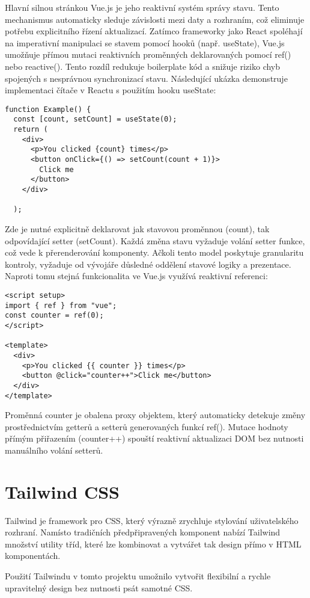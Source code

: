 Hlavní silnou stránkou Vue.js je jeho reaktivní systém správy stavu. Tento mechanismus automaticky sleduje závislosti mezi daty a rozhraním, což eliminuje potřebu explicitního řízení aktualizací\cite{vuejsVuejsDocs}.
Zatímco frameworky jako React spoléhají na imperativní manipulaci se stavem pomocí hooků (např. useState), Vue.js umožňuje přímou mutaci reaktivních proměnných deklarovaných pomocí ref() nebo reactive(). Tento rozdíl redukuje boilerplate kód a snižuje riziko chyb spojených s nesprávnou synchronizací stavu. Následující ukázka demonstruje implementaci čítače v Reactu s použitím hooku useState:
\begin{lstlisting}
function Example() {
  const [count, setCount] = useState(0);
  return (
    <div>
      <p>You clicked {count} times</p>
      <button onClick={() => setCount(count + 1)}>
        Click me
      </button>
    </div>

  );
\end{lstlisting}
Zde je nutné explicitně deklarovat jak stavovou proměnnou (count), tak odpovídající setter (setCount). Každá změna stavu vyžaduje volání setter funkce, což vede k přerenderování komponenty. Ačkoli tento model poskytuje granularitu kontroly, vyžaduje od vývojáře důsledné oddělení stavové logiky a prezentace. Naproti tomu stejná funkcionalita ve Vue.js využívá reaktivní referenci:
\begin{lstlisting}
<script setup>
import { ref } from "vue";
const counter = ref(0);
</script>

<template>
  <div>
    <p>You clicked {{ counter }} times</p>
    <button @click="counter++">Click me</button>
  </div>
</template>
\end{lstlisting}
Proměnná counter je obalena proxy objektem, který automaticky detekuje změny prostřednictvím getterů a setterů generovaných funkcí ref(). Mutace hodnoty přímým přiřazením (counter++) spouští reaktivní aktualizaci DOM bez nutnosti manuálního volání setterů.

\section{Tailwind CSS}
Tailwind je framework pro CSS, který výrazně zrychluje stylování uživatelského rozhraní. Namísto tradičních předpřipravených komponent nabízí Tailwind množství utility tříd, které lze kombinovat a vytvářet tak design přímo v HTML komponentách.

Použití Tailwindu v tomto projektu umožnilo vytvořit flexibilní a rychle upravitelný design bez nutnosti psát samotné CSS.

